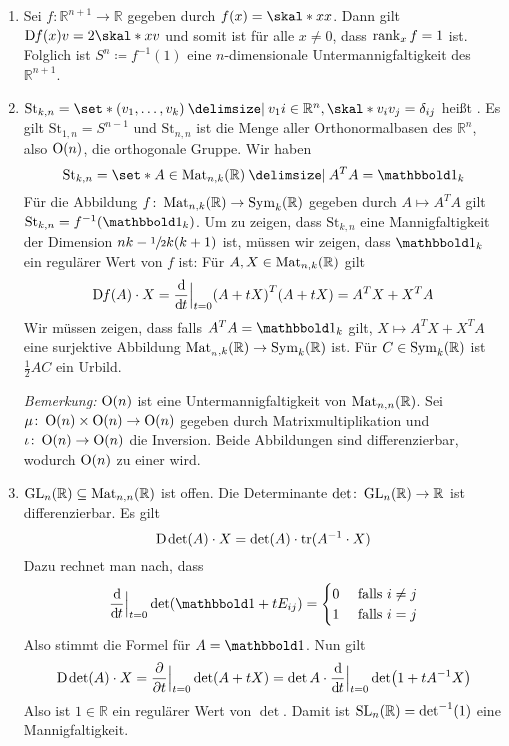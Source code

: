 \begin{beispiel}[{name=[Mannigfaltigkeiten als Urbilder regulärer Werte]}]
	\begin{enumerate}[1)]
		\item Sei $f \colon \mathbb{R}^{n+1} \to \mathbb{R}$ gegeben durch $f(x) = \skal*{x}{x}$.
		Dann gilt $\D f(x) v = 2 \skal*{x}{v}$ und somit ist für alle $x\neq 0$, dass $\operatorname{rank}_x f = 1$ ist.
		Folglich ist $S^n \coloneqq f^{-1}(1)$ eine $n$-dimensionale Untermannigfaltigkeit des $\mathbb{R}^{n+1}$.
		\item $\mathrm{St}_{k,n} = \set*{(v_1, \ldots,v_k) \given v_1i \in \mathbb{R}^n, \skal*{v_i}{v_j} = \delta_{ij}}$ heißt .
		Es gilt $\mathrm{St}_{1,n}=S^{n-1}$ und $\mathrm{St}_{n,n}$ ist die Menge aller Orthonormalbasen des $\mathbb{R}^n$, also $\operatorname{O}(n)$, die orthogonale Gruppe.
		Wir haben
		\[
			\mathrm{St}_{k,n} = \set*{A \in \Mat_{n,k}(\mathbb{R}) \given A^T A = \ind_k}
		\]
		Für die Abbildung $f \colon \operatorname{Mat}_{n,k}(\mathbb{R}) \to \operatorname{Sym}_{k}(\mathbb{R})$ gegeben durch $A \mapsto A^T A$ gilt $\mathrm{St}_{k,n} = f^{-1}(\ind_k)$.
		Um zu zeigen, dass $\mathrm{St}_{k,n}$ eine Mannigfaltigkeit der Dimension $nk - \sfrac{1}{2}k(k+1)$ ist, müssen wir zeigen, dass $\ind_k$ ein regulärer Wert von $f$ ist:
		Für $A,X \in \operatorname{Mat}_{n,k}(\mathbb{R})$ gilt
		\begin{align}
			\D f(A) \cdot X = \diffd{}{t}\Big|_{t=0} \enbrace*{A + tX}^T \enbrace*{A + tX} = A^T X+ X^T A
		\end{align}
		Wir müssen zeigen, dass falls $A^T A = \ind_k$ gilt, $X \mapsto A^T X + X^T A$ eine surjektive Abbildung $\operatorname{Mat}_{_n,k}(\mathbb{R}) \to \operatorname{Sym}_k(\mathbb{R})$ ist.
		Für $C \in \operatorname{Sym}_k(\mathbb{R})$ ist $\frac{1}{2} AC$ ein Urbild.
		
		\emph{Bemerkung:} $\operatorname{O}(n)$ ist eine Untermannigfaltigkeit von $\operatorname{Mat}_{n,n}(\mathbb{R})$.
		Sei $\mu \colon \operatorname{O}(n) \times \operatorname{O}(n) \to \operatorname{O}(n)$ gegeben durch Matrixmultiplikation und $\iota \colon \operatorname{O}(n) \to \operatorname{O}(n)$ die Inversion.
		Beide Abbildungen sind differenzierbar, wodurch $\operatorname{O}(n)$ zu einer  wird.
		\item $\operatorname{GL}_n(\mathbb{R}) \subseteq \operatorname{Mat}_{n,n}(\mathbb{R})$ ist offen.
		Die Determinante $\det \colon \operatorname{GL}_n(\mathbb{R}) \to \mathbb{R}$ ist differenzierbar.
		Es gilt
		\[
			\mathrm{D}\mkern-1.0mu \det (A) \cdot X = \det (A) \cdot \operatorname{tr}(A^{-1} \cdot X)
		\]
		Dazu rechnet man nach, dass 
		\[
			\diffd{}{t}\Big|_{t=0} \det \enbrace*{\ind + t E_{ij}} = \begin{cases}
				0 &\text{ falls }i \neq j\\
				1 &\text{ falls } i =j
			\end{cases}
		\]
		Also stimmt die Formel für $A=\ind$.
		Nun gilt
		\[
			\D \det(A) \cdot X = \diff{}{t}\Big|_{t=0} \det (A + tX) = \det A \cdot \diffd{}{t}\Big|_{t=0} \det \enbrace*{1 + tA^{-1} X}
		\]
		Also ist $1 \in \mathbb{R}$ ein regulärer Wert von $\det$.
		Damit ist $\operatorname{SL}_n(\mathbb{R}) = \det^{-1}(1)$ eine Mannigfaltigkeit.
	\end{enumerate}
\end{beispiel}

